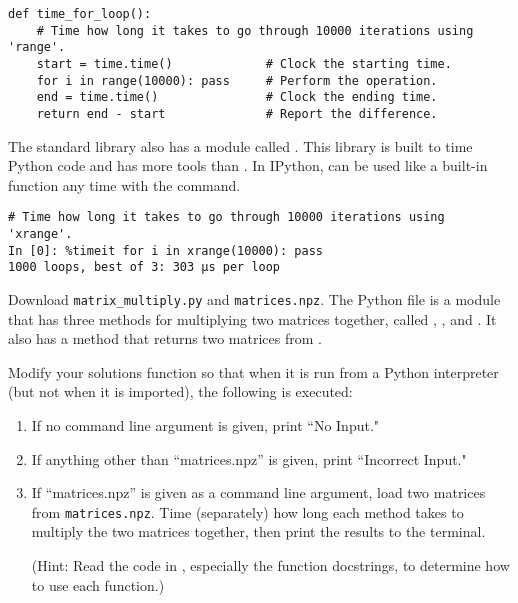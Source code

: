 \begin{lstlisting}
def time_for_loop():
    # Time how long it takes to go through 10000 iterations using 'range'.
    start = time.time()             # Clock the starting time.
    for i in range(10000): pass     # Perform the operation.
    end = time.time()               # Clock the ending time.
    return end - start              # Report the difference.
\end{lstlisting}

The standard library also has a module called .
This library is built to time Python code and has more tools than 
.
In IPython,  can be used like a built-in function any time with the  command.

\begin{lstlisting}
# Time how long it takes to go through 10000 iterations using 'xrange'.
In [0]: %timeit for i in xrange(10000): pass 
1000 loops, best of 3: 303 µs per loop
\end{lstlisting}

\begin{problem}
Download \texttt{matrix\_multiply.py} and \texttt{matrices.npz}.
The Python file  is a module that has three methods for multiplying two matrices together, called , , and .
It also has a  method that returns two matrices from .

Modify your solutions function so that when it is run from a Python interpreter (but not when it is imported), the following is executed:
\begin{enumerate}
\item If no command line argument is given, print ``No Input."
\item If anything other than ``matrices.npz'' is given, print ``Incorrect Input."
\item If ``matrices.npz'' is given as a command line argument, load two matrices from \texttt{matrices.npz}. Time (separately) how long each method takes to multiply the two matrices together, then print the results to the terminal.

(Hint: Read the code in , especially the function docstrings, to determine how to use each function.)
\end{enumerate}
\end{problem}
